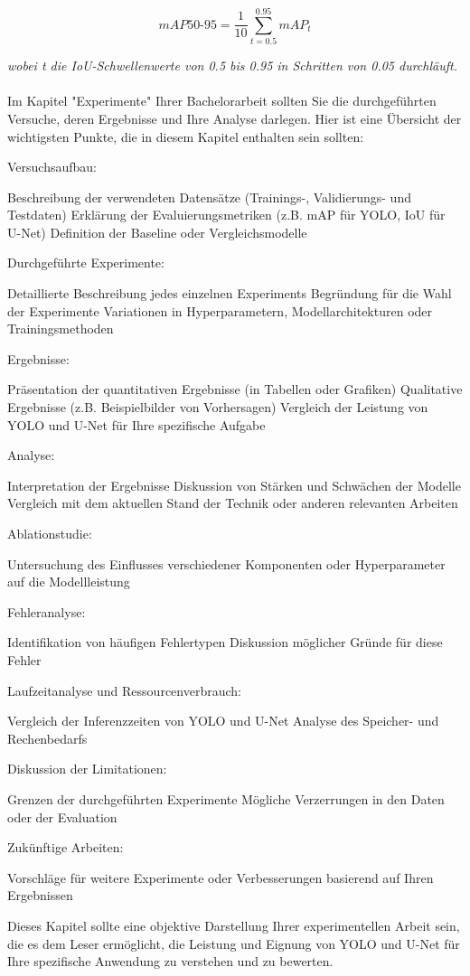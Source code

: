 \[\mathit{mAP50\mbox{-}95} = \frac{1}{10} \sum_{t=0.5}^{0.95} mAP_t\]

\emph{wobei t die IoU-Schwellenwerte von 0.5 bis 0.95 in Schritten von 0.05 durchläuft.}
\\\\




Im Kapitel "Experimente" Ihrer Bachelorarbeit sollten Sie die durchgeführten Versuche, deren Ergebnisse und Ihre Analyse darlegen. Hier ist eine Übersicht der wichtigsten Punkte, die in diesem Kapitel enthalten sein sollten:

Versuchsaufbau:

Beschreibung der verwendeten Datensätze (Trainings-, Validierungs- und Testdaten)
Erklärung der Evaluierungsmetriken (z.B. mAP für YOLO, IoU für U-Net)
Definition der Baseline oder Vergleichsmodelle


Durchgeführte Experimente:

Detaillierte Beschreibung jedes einzelnen Experiments
Begründung für die Wahl der Experimente
Variationen in Hyperparametern, Modellarchitekturen oder Trainingsmethoden


Ergebnisse:

Präsentation der quantitativen Ergebnisse (in Tabellen oder Grafiken)
Qualitative Ergebnisse (z.B. Beispielbilder von Vorhersagen)
Vergleich der Leistung von YOLO und U-Net für Ihre spezifische Aufgabe


Analyse:

Interpretation der Ergebnisse
Diskussion von Stärken und Schwächen der Modelle
Vergleich mit dem aktuellen Stand der Technik oder anderen relevanten Arbeiten


Ablationstudie:

Untersuchung des Einflusses verschiedener Komponenten oder Hyperparameter auf die Modellleistung


Fehleranalyse:

Identifikation von häufigen Fehlertypen
Diskussion möglicher Gründe für diese Fehler


Laufzeitanalyse und Ressourcenverbrauch:

Vergleich der Inferenzzeiten von YOLO und U-Net
Analyse des Speicher- und Rechenbedarfs


Diskussion der Limitationen:

Grenzen der durchgeführten Experimente
Mögliche Verzerrungen in den Daten oder der Evaluation


Zukünftige Arbeiten:

Vorschläge für weitere Experimente oder Verbesserungen basierend auf Ihren Ergebnissen



Dieses Kapitel sollte eine objektive Darstellung Ihrer experimentellen Arbeit sein, die es dem Leser ermöglicht, die Leistung und Eignung von YOLO und U-Net für Ihre spezifische Anwendung zu verstehen und zu bewerten.